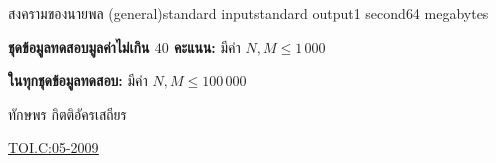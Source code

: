 \documentclass[11pt,a4paper]{article}
\begin{document}
\begin{problem}{สงครามของนายพล (general)}{standard input}{standard output}{1 second}{64 megabytes}
\Examples

\begin{example}
%
\end{example}

\Scoring

\textbf{ชุดข้อมูลทดสอบมูลค่าไม่เกิน $40$ คะแนน: }มีค่า $N,M \leq 1\,000$ 

\textbf{ในทุกชุดข้อมูลทดสอบ:} มีค่า $N,M \leq 100\,000$
  
\Source

ทักษพร กิตติอัครเสถียร

\underline{\href{http://www.thailandoi.org/toi.c/05-2009}{TOI.C:05-2009}}

\end{problem}
\end{document}
